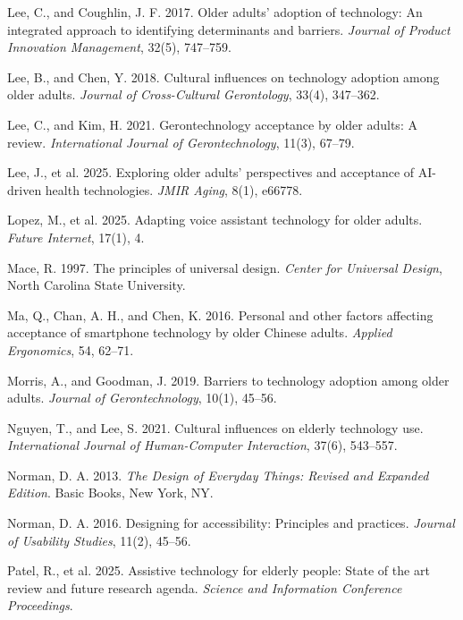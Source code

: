 \documentclass[acmlarge]{acmart}
\begin{document}
{\begin{thebibliography}{50}
Lee, C., and Coughlin, J. F. 2017. Older adults’ adoption of technology: An integrated approach to identifying determinants and barriers. \textit{Journal of Product Innovation Management}, 32(5), 747--759.

Lee, B., and Chen, Y. 2018. Cultural influences on technology adoption among older adults. \textit{Journal of Cross-Cultural Gerontology}, 33(4), 347--362.

Lee, C., and Kim, H. 2021. Gerontechnology acceptance by older adults: A review. \textit{International Journal of Gerontechnology}, 11(3), 67--79.

Lee, J., et al. 2025. Exploring older adults' perspectives and acceptance of AI-driven health technologies. \textit{JMIR Aging}, 8(1), e66778.

Lopez, M., et al. 2025. Adapting voice assistant technology for older adults. \textit{Future Internet}, 17(1), 4.

Mace, R. 1997. The principles of universal design. \textit{Center for Universal Design}, North Carolina State University.

Ma, Q., Chan, A. H., and Chen, K. 2016. Personal and other factors affecting acceptance of smartphone technology by older Chinese adults. \textit{Applied Ergonomics}, 54, 62--71.

Morris, A., and Goodman, J. 2019. Barriers to technology adoption among older adults. \textit{Journal of Gerontechnology}, 10(1), 45--56.

Nguyen, T., and Lee, S. 2021. Cultural influences on elderly technology use. \textit{International Journal of Human-Computer Interaction}, 37(6), 543--557.

Norman, D. A. 2013. \textit{The Design of Everyday Things: Revised and Expanded Edition}. Basic Books, New York, NY.

Norman, D. A. 2016. Designing for accessibility: Principles and practices. \textit{Journal of Usability Studies}, 11(2), 45--56.

Patel, R., et al. 2025. Assistive technology for elderly people: State of the art review and future research agenda. \textit{Science and Information Conference Proceedings}.


\end{thebibliography}}
\end{document}
